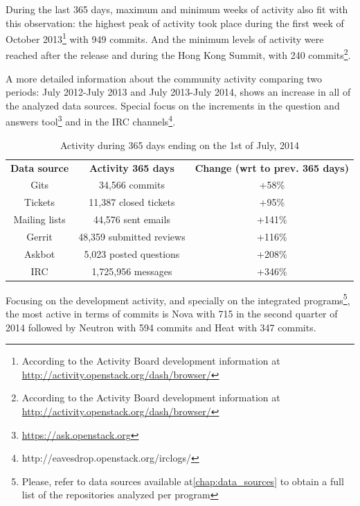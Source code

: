 \documentclass[a4wide,11pt]{report}
\begin{document}
During the last 365 days, maximum and minimum weeks of activity also fit with this observation: the highest peak of activity took place during the first week of October 2013\footnote{According to the Activity Board development information at
\url{http://activity.openstack.org/dash/browser/}} with 949 commits. And the minimum levels of activity were
reached after the release and during the Hong Kong Summit, with 240 commits\footnote{According to the Activity Board development information at
\url{http://activity.openstack.org/dash/browser/}}.

A more detailed information about the community activity comparing two periods: July 2012-July 2013 and July 2013-July 2014, shows an increase in all of the analyzed data sources. Special focus on the increments in the question and answers tool\footnote{\url{https://ask.openstack.org}} and in the IRC channels\footnote{http://eavesdrop.openstack.org/irclogs/}.

\begin{center}
\begin{table}[H]
\begin{tabular}{ c|c|c| } 

\textbf{Data source} & \textbf{Activity 365 days} & \textbf{Change (wrt to prev. 365 days)} \\

 Gits    & 34,566 commits & +58\% \\ 
 Tickets & 11,387 closed tickets & +95\% \\
 Mailing lists & 44,576 sent emails & +141\% \\ 
 Gerrit  & 48,359 submitted reviews & +116\% \\ 
 Askbot & 5,023 posted questions & +208\% \\ 
 IRC & 1,725,956 messages & +346\% \\
\end{tabular}
\caption{Activity during 365 days ending on the 1st of July, 2014}
\end{table}
\end{center}

Focusing on the development activity, and specially on the integrated programs\footnote{Please, refer to data sources available at\ref{chap:data_sources} to obtain a full list of the repositories analyzed per program},
the most active in terms of commits is Nova with 715 in the second quarter of 2014 followed by Neutron with 594 commits and Heat with 347 commits.
\end{document}

